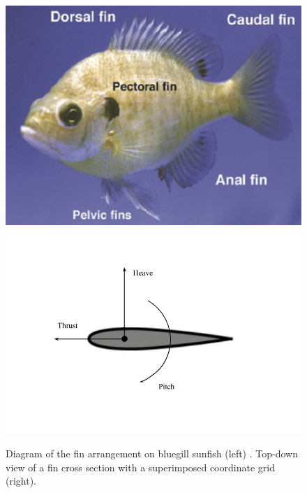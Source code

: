 \begin{figure}
\begin{center}
\includegraphics[width=0.44\columnwidth]{figures/Figure1.png}
\includegraphics[width=0.54\columnwidth]{figures/Fin Frame.png}
\end{center}
\caption{Diagram of the fin arrangement on bluegill sunfish (left) \citep{Lauder2004}. Top-down view of a fin cross section with a superimposed coordinate grid (right).}
\label{fig:app:Bluegill}
\end{figure}

